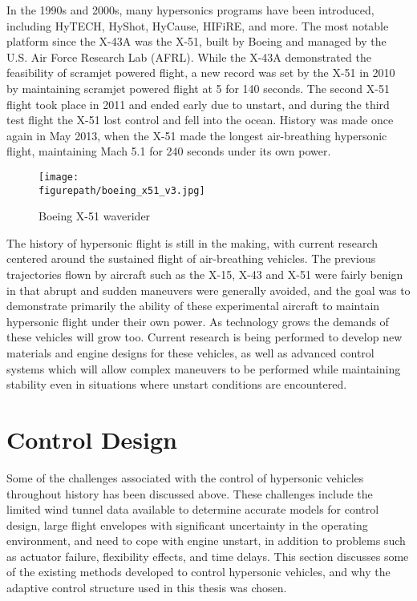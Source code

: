 In the 1990s and 2000s, many hypersonics programs have been introduced, including HyTECH, HyShot, HyCause, HIFiRE, and more.
The most notable platform since the X-43A was the X-51, built by Boeing and managed by the U.S. Air Force Research Lab (AFRL).
While the X-43A demonstrated the feasibility of scramjet powered flight, a new record was set by the X-51 in 2010 by maintaining scramjet powered flight at 5 for 140 seconds.
The second X-51 flight took place in 2011 and ended early due to unstart, and during the third test flight the X-51 lost control and fell into the ocean.
History was made once again in May 2013, when the X-51 made the longest air-breathing hypersonic flight, maintaining Mach 5.1 for 240 seconds under its own power.

\begin{figure}[h]
  \begin{center}
    \texttt{[image: \\figurepath/boeing\_x51\_v3.jpg]}
    \caption{Boeing X-51 waverider}
  \end{center}
\end{figure}

The history of hypersonic flight is still in the making, with current research centered around the sustained flight of air-breathing vehicles.
The previous trajectories flown by aircraft such as the X-15, X-43 and X-51 were fairly benign in that abrupt and sudden maneuvers were generally avoided, and the goal was to demonstrate primarily the ability of these experimental aircraft to maintain hypersonic flight under their own power.
As technology grows the demands of these vehicles will grow too.
Current research is being performed to develop new materials and engine designs for these vehicles, as well as advanced control systems which will allow complex maneuvers to be performed while maintaining stability even in situations where unstart conditions are encountered.


\section{Control Design}

Some of the challenges associated with the control of hypersonic vehicles throughout history has been discussed above.
These challenges include the limited wind tunnel data available to determine accurate models for control design, large flight envelopes with significant uncertainty in the operating environment, and need to cope with engine unstart, in addition to problems such as actuator failure, flexibility effects, and time delays.
This section discusses some of the existing methods developed to control hypersonic vehicles, and why the adaptive control structure used in this thesis was chosen.

